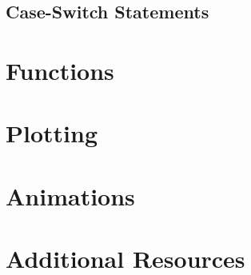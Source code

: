 \subsection{Case-Switch Statements}

\section{Functions}


\section{Plotting}


\section{Animations}


\section{Additional Resources}


